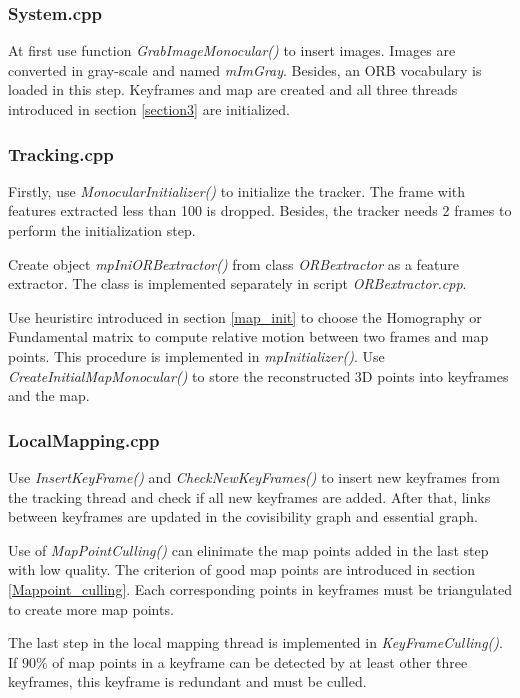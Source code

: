\documentclass[letterpaper, 10 pt, conference]{ieeeconf}  %
\begin{document}
\subsubsection{System.cpp}

At first use function \textit{GrabImageMonocular()} to insert images. Images are converted in gray-scale and named \textit{mImGray}. Besides, an ORB vocabulary is loaded in this step. Keyframes and map are created and all three threads introduced in section \ref{section3} are initialized.

\subsubsection{Tracking.cpp}
Firstly, use \textit{MonocularInitializer()} to initialize the tracker. The frame with features extracted less than 100 is dropped. Besides, the tracker needs 2 frames to perform the initialization step.

Create object \textit{mpIniORBextractor()} from class \textit{ORBextractor} as a feature extractor. The class is implemented separately in script \textit{ORBextractor.cpp}.

Use heuristirc introduced in section \ref{map_init} to choose the Homography or Fundamental matrix to compute relative motion between two frames and map points. This procedure is implemented in \textit{mpInitializer()}. Use \textit{CreateInitialMapMonocular()} to store the reconstructed 3D points into keyframes and the map.

\subsubsection{LocalMapping.cpp}
Use \textit{InsertKeyFrame()} and \textit{CheckNewKeyFrames()} to insert new keyframes from the tracking thread and check if all new keyframes are added. After that, links between keyframes are updated in the covisibility graph and essential graph.

Use of \textit{MapPointCulling()} can elinimate the map points added in the last step with low quality. The criterion of good map points are introduced in section \ref{Mappoint_culling}. Each corresponding points in keyframes must be triangulated to create more map points. 

The last step in the local mapping thread is implemented in \textit{KeyFrameCulling()}. If $90\%$ of map points in a keyframe can be detected by at least other three keyframes, this keyframe is redundant and must be culled.
\end{document}
